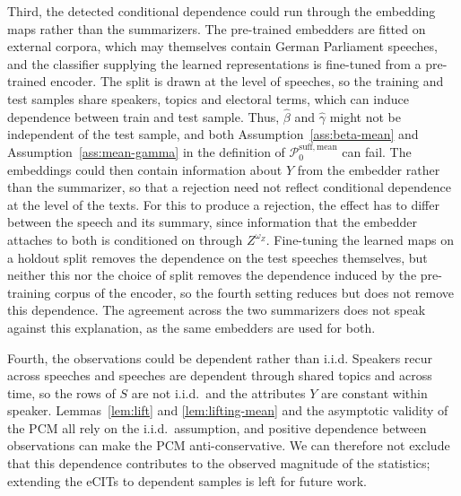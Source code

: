 \documentclass[twoside,11pt]{article}
\begin{document}
Third, the detected conditional dependence could run through the embedding maps rather than the summarizers.
The pre-trained embedders are fitted on external corpora, which may themselves contain German Parliament speeches, and the classifier supplying the learned representations is fine-tuned from a pre-trained encoder. %
The split is drawn at the level of speeches, so the training and test samples share speakers,  topics and electoral terms, which can induce dependence between train and test sample.
Thus, $\hat\beta$ and $\hat\gamma$ might not be independent of the test sample, and both Assumption~\ref{ass:beta-mean} and Assumption~\ref{ass:mean-gamma} in the definition of $\mathcal{P}_0^{\mathrm{suff,mean}}$ can fail.
The embeddings could then contain information about $Y$ from the embedder rather than the summarizer, so that a rejection need not reflect conditional dependence at the level of the texts.
For this to produce a rejection, the effect has to differ between the speech and its summary, since information that the embedder attaches to both is conditioned on through $Z^{\omega_Z}$.
Fine-tuning the learned maps on a holdout split removes the dependence on the test speeches themselves, but neither this nor the choice of split removes the dependence induced by the pre-training corpus of the encoder, so the fourth setting reduces but does not remove this dependence.
The agreement across the two summarizers does not speak against this explanation, as the same embedders are used for both.

Fourth, the observations could be dependent rather than i.i.d.
Speakers recur across speeches and speeches are dependent through shared topics and across time, so the rows of $S$ are not i.i.d.\ and the attributes $Y$ are constant within speaker.
Lemmas~\ref{lem:lift} and \ref{lem:lifting-mean} and the asymptotic validity of the PCM all rely on the i.i.d.\ assumption, and positive dependence between observations can make the PCM anti-conservative.
We can therefore not exclude that this dependence contributes to the observed magnitude of the statistics; extending the eCITs to dependent samples is left for future work.
\end{document}
